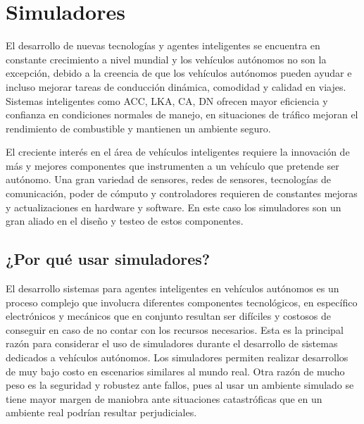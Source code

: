 \section{Simuladores} \label{sec:simuladores}

El desarrollo de nuevas tecnologías y agentes inteligentes se encuentra en constante crecimiento a nivel mundial y los vehículos autónomos no son la excepción, debido a la creencia de que los vehículos autónomos pueden ayudar e incluso mejorar tareas de conducción dinámica, comodidad y calidad en viajes. Sistemas inteligentes como ACC, LKA, CA, DN ofrecen mayor eficiencia y confianza en condiciones normales de manejo, en situaciones de tráfico mejoran el rendimiento de combustible y mantienen un ambiente seguro.

El creciente interés en el área de  vehículos inteligentes requiere la innovación de más y mejores componentes que instrumenten a un vehículo que pretende ser autónomo. Una gran variedad de sensores, redes de sensores, tecnologías de comunicación, poder de cómputo y controladores requieren de constantes mejoras y actualizaciones en hardware y software\cite{eskandarian2012handbook}.  En este caso los simuladores son un gran aliado en el diseño y testeo de estos componentes.


\subsection{¿Por qué usar simuladores?} \label{sub:por_qué_usar_ simuladores}

El desarrollo sistemas para agentes inteligentes en vehículos autónomos es un proceso complejo que involucra diferentes componentes tecnológicos, en específico electrónicos y mecánicos que en conjunto resultan ser difíciles y costosos de conseguir en caso de no contar con los recursos necesarios. Esta es la principal razón para considerar el uso de simuladores durante el desarrollo de sistemas dedicados a vehículos autónomos. Los simuladores permiten realizar desarrollos de muy bajo costo en escenarios similares al mundo real. Otra razón de mucho peso es la seguridad y robustez ante fallos, pues al usar un ambiente simulado se tiene mayor margen de maniobra ante situaciones catastróficas que en un ambiente real podrían resultar perjudiciales.

